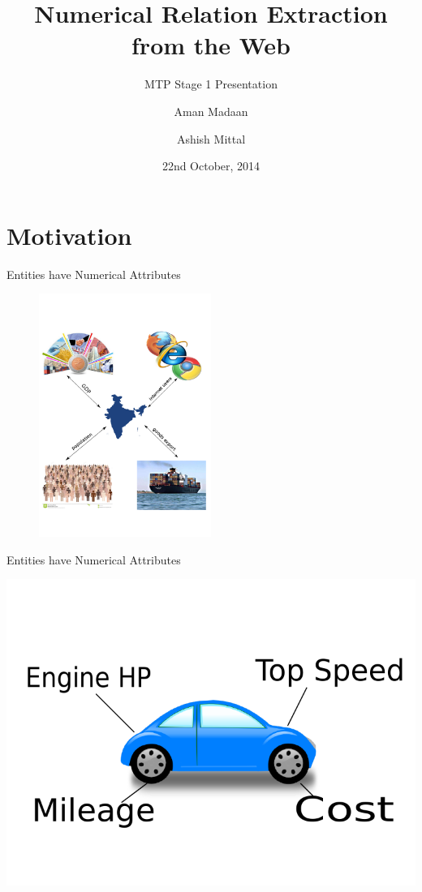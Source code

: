 \documentclass{beamer}
\title{Numerical Relation Extraction from the Web}
\subtitle{MTP Stage 1 Presentation}
\author[]{Aman Madaan \and Ashish Mittal}
\institute[]{
  Indian Institute of Technology Bombay, Mumbai
}
\date{22nd October, 2014}
\begin{document}
\maketitle
\section{Motivation}

\begin{frame}{Entities have Numerical Attributes}

    \begin{figure}
    \centering
    \includegraphics[width = 0.5\textwidth]{images/motivation}
  \end{figure}
 
\end{frame}

\begin{frame}{Entities have Numerical Attributes}
 \begin{center}
 \includegraphics[scale=0.45]{./imgs/car.pdf}
\end{center}

\end{frame}
\end{document}

